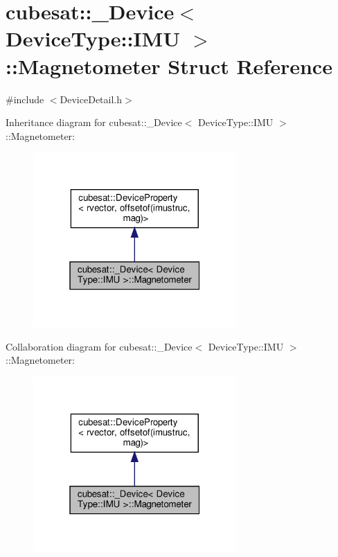 \hypertarget{structcubesat_1_1__Device_3_01DeviceType_1_1IMU_01_4_1_1Magnetometer}{}\section{cubesat\+:\+:\+\_\+\+Device$<$ Device\+Type\+:\+:I\+MU $>$\+:\+:Magnetometer Struct Reference}
\label{structcubesat_1_1__Device_3_01DeviceType_1_1IMU_01_4_1_1Magnetometer}


{\ttfamily \#include $<$Device\+Detail.\+h$>$}



Inheritance diagram for cubesat\+:\+:\+\_\+\+Device$<$ Device\+Type\+:\+:I\+MU $>$\+:\+:Magnetometer\+:\nopagebreak
\begin{figure}[H]
\begin{center}
\leavevmode
\includegraphics[width=220pt]{structcubesat_1_1__Device_3_01DeviceType_1_1IMU_01_4_1_1Magnetometer__inherit__graph}
\end{center}
\end{figure}


Collaboration diagram for cubesat\+:\+:\+\_\+\+Device$<$ Device\+Type\+:\+:I\+MU $>$\+:\+:Magnetometer\+:\nopagebreak
\begin{figure}[H]
\begin{center}
\leavevmode
\includegraphics[width=220pt]{structcubesat_1_1__Device_3_01DeviceType_1_1IMU_01_4_1_1Magnetometer__coll__graph}
\end{center}
\end{figure}
